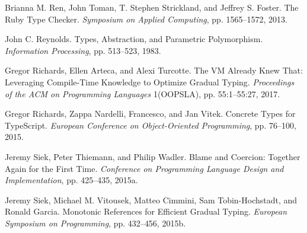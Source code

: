 \documentclass[screen=true, 10pt, acmsmall]{acmart}
\newenvironment{SingleColumn}{\begin{list}{}{\topsep=0pt\partopsep=0pt%
\listparindent=0pt\itemindent=0pt\labelwidth=0pt\leftmargin=0pt\rightmargin=0pt%
\itemsep=0pt\parsep=0pt}\item}{\end{list}}
\newenvironment{AutoBibliography}{\begin{small}}{\end{small}}
\newcommand{\Autobibentry}[1]{\hspace{0.05\linewidth}\parbox[t]{0.95\linewidth}{\parindent=-0.05\linewidth#1\vspace{1.0ex}}}
\begin{document}
\begin{AutoBibliography}
\begin{SingleColumn}
\label{t:x28autobib_x22Brianna_Mx2e_Renx2c_John_Tomanx2c_Tx2e_Stephen_Stricklandx2c_and_Jeffrey_Sx2e_FosterThe_Ruby_Type_CheckerSymposium_on_Applied_Computingx2c_ppx2e_1565x2dx2d15722013x22x29}\Autobibentry{Brianna M. Ren, John Toman, T. Stephen Strickland, and Jeffrey S. Foster. The Ruby Type Checker. \textit{Symposium on Applied Computing}, pp. 1565{--}1572, 2013.}

\label{t:x28autobib_x22John_Cx2e_ReynoldsTypesx2c_Abstractionx2c_and_Parametric_PolymorphismInformation_Processingx2c_ppx2e_513x2dx2d5231983x22x29}\Autobibentry{John C. Reynolds. Types, Abstraction, and Parametric Polymorphism. \textit{Information Processing}, pp. 513{--}523, 1983.}

\label{t:x28autobib_x22Gregor_Richardsx2c_Ellen_Artecax2c_and_Alexi_TurcotteThe_VM_Already_Knew_Thatx3a_Leveraging_Compilex2dTime_Knowledge_to_Optimize_Gradual_TypingProceedings_of_the_ACM_on_Programming_Languages_1x28OOPSLAx29x2c_ppx2e_55x3a1x2dx2d55x3a272017x22x29}\Autobibentry{Gregor Richards, Ellen Arteca, and Alexi Turcotte. The VM Already Knew That: Leveraging Compile{-}Time Knowledge to Optimize Gradual Typing. \textit{Proceedings of the ACM on Programming Languages} 1(OOPSLA), pp. 55:1{--}55:27, 2017.}

\label{t:x28autobib_x22Gregor_Richardsx2c_Zappa_Nardellix2c_Francescox2c_and_Jan_VitekConcrete_Types_for_TypeScriptEuropean_Conference_on_Objectx2dOriented_Programmingx2c_ppx2e_76x2dx2d1002015x22x29}\Autobibentry{Gregor Richards, Zappa Nardelli, Francesco, and Jan Vitek. Concrete Types for TypeScript. \textit{European Conference on Object{-}Oriented Programming}, pp. 76{--}100, 2015.}

\label{t:x28autobib_x22Jeremy_Siekx2c_Peter_Thiemannx2c_and_Philip_WadlerBlame_and_Coercionx3a_Together_Again_for_the_First_TimeConference_on_Programming_Language_Design_and_Implementationx2c_ppx2e_425x2dx2d4352015x22x29}\Autobibentry{Jeremy Siek, Peter Thiemann, and Philip Wadler. Blame and Coercion: Together Again for the First Time. \textit{Conference on Programming Language Design and Implementation}, pp. 425{--}435, 2015a.}

\label{t:x28autobib_x22Jeremy_Siekx2c_Michael_Mx2e_Vitousekx2c_Matteo_Cimminix2c_Sam_Tobinx2dHochstadtx2c_and_Ronald_GarciaMonotonic_References_for_Efficient_Gradual_TypingEuropean_Symposium_on_Programmingx2c_ppx2e_432x2dx2d4562015x22x29}\Autobibentry{Jeremy Siek, Michael M. Vitousek, Matteo Cimmini, Sam Tobin{-}Hochstadt, and Ronald Garcia. Monotonic References for Efficient Gradual Typing. \textit{European Symposium on Programming}, pp. 432{--}456, 2015b.}


\end{SingleColumn}
\end{AutoBibliography}
\end{document}
